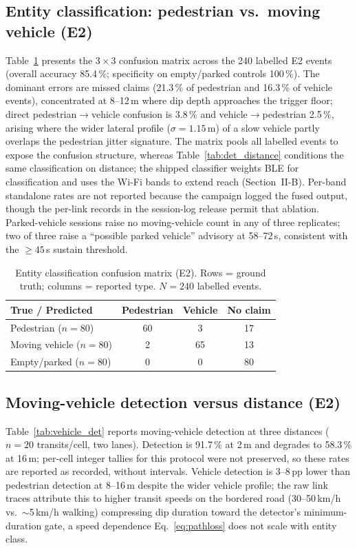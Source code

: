 \documentclass[journal,10pt]{IEEEtran}
\begin{document}
\subsection{Entity classification: pedestrian vs.\ moving vehicle (E2)}
Table~\ref{tab:confusion} presents the $3 \times 3$ confusion matrix across
the 240 labelled E2 events (overall accuracy 85.4\,\%; specificity on
empty/parked controls 100\,\%). The dominant errors are missed claims
(21.3\,\% of pedestrian and 16.3\,\% of vehicle events), concentrated at
8--12\,m where dip depth approaches the trigger floor; direct
pedestrian$\to$vehicle confusion is 3.8\,\% and vehicle$\to$pedestrian
2.5\,\%, arising where the wider lateral profile ($\sigma = 1.15$\,m) of a
slow vehicle partly overlaps the pedestrian jitter signature. The matrix
pools all labelled events to expose the confusion structure, whereas
Table~\ref{tab:det_distance} conditions the same classification on distance;
the shipped classifier weights BLE for classification and uses the Wi-Fi
bands to extend reach (Section~II-B). Per-band standalone rates are not reported because the campaign logged the
fused output, though the per-link records in the session-log release permit
that ablation. Parked-vehicle sessions raise no moving-vehicle count in any of
three replicates; two of three raise a ``possible parked vehicle'' advisory at
58--72\,s, consistent with the $\geq45$\,s sustain threshold.

\begin{table}[htbp]
\centering
\caption{Entity classification confusion matrix (E2). Rows = ground truth; columns =
reported type. $N = 240$ labelled events.}
\label{tab:confusion}
\footnotesize
\begin{tabular}{@{}lccc@{}}
\toprule
\textbf{True / Predicted} & \textbf{Pedestrian} & \textbf{Vehicle} &
\textbf{No claim} \\
\midrule
Pedestrian  ($n = 80$)  & 60 & 3 & 17 \\
Moving vehicle ($n = 80$) & 2 & 65 & 13 \\
Empty/parked ($n = 80$) & 0 & 0 & 80 \\
\bottomrule
\end{tabular}
\end{table}

\subsection{Moving-vehicle detection versus distance (E2)}
Table~\ref{tab:vehicle_det} reports moving-vehicle detection at three
distances ($n = 20$ transits/cell, two lanes). Detection is 91.7\,\% at 2\,m
and degrades to 58.3\,\% at 16\,m; per-cell integer tallies for this protocol
were not preserved, so these rates are reported as recorded, without
intervals. Vehicle detection is 3--8\,pp lower than pedestrian detection at
8--16\,m despite the wider vehicle profile; the raw link traces attribute
this to higher transit speeds on the bordered road (30--50\,km/h vs.\
$\sim$5\,km/h walking) compressing dip duration toward the detector's
minimum-duration gate, a speed dependence Eq.~\eqref{eq:pathloss} does not
scale with entity class.
\end{document}
